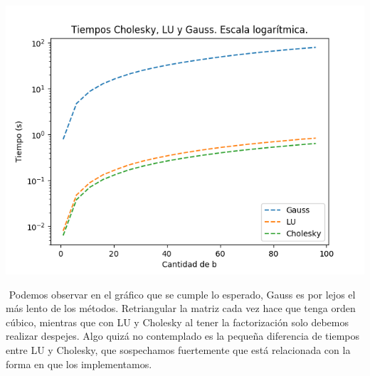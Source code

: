 {\centering
    \includegraphics[scale=0.70]{informe/imagenes/choleskyCantB.png}
}

$ $\newline
Podemos observar en el gráfico que se cumple lo esperado, Gauss es por lejos el más lento de los métodos. Retriangular la matriz cada vez hace que tenga orden cúbico, mientras que con LU y Cholesky al tener la factorización solo debemos realizar despejes. Algo quizá no contemplado es la pequeña diferencia de tiempos entre LU y Cholesky, que sospechamos fuertemente que está relacionada con la forma en que los implementamos. \\



